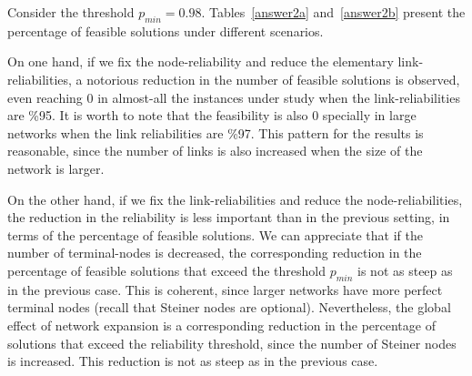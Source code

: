Consider the threshold $p_{min}=0.98$. Tables~\ref{answer2a} and~\ref{answer2b} present the percentage of feasible solutions under different scenarios.

On one hand, if we fix the node-reliability and reduce the elementary link-reliabilities, a notorious reduction in 
the number of feasible solutions is observed, even reaching $0$ in almost-all the instances under study 
when the link-reliabilities are \%95. It is worth to note that the feasibility is also 0 specially 
in large networks when the link reliabilities are \%97. This pattern for the results is reasonable, since the number of links is also increased when the size of the network is larger.

On the other hand, if we fix the link-reliabilities and reduce the node-reliabilities, the 
reduction in the reliability is less important than in the previous setting, in terms of 
the percentage of feasible solutions. We can appreciate that if the number of terminal-nodes is decreased, 
the corresponding reduction in the percentage of feasible solutions that exceed the threshold $p_{min}$ is 
not as steep as in the previous case. This is coherent, since larger networks have more perfect terminal nodes 
(recall that Steiner nodes are optional). Nevertheless, the global effect of network expansion is a corresponding reduction in the percentage of solutions that exceed the reliability threshold, since the number of Steiner nodes is increased. This reduction is not as steep as in the previous case. 

